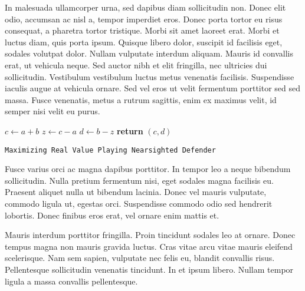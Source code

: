 \documentclass{article}
\theoremstyle{plain}
\theoremstyle{definition}
\theoremstyle{remark}
\begin{document}
In malesuada ullamcorper urna, sed dapibus diam sollicitudin non. Donec elit odio, accumsan ac nisl a, tempor imperdiet eros. Donec porta tortor eu risus consequat, a pharetra tortor tristique. Morbi sit amet laoreet erat. Morbi et luctus diam, quis porta ipsum. Quisque libero dolor, suscipit id facilisis eget, sodales volutpat dolor. Nullam vulputate interdum aliquam. Mauris id convallis erat, ut vehicula neque. Sed auctor nibh et elit fringilla, nec ultricies dui sollicitudin. Vestibulum vestibulum luctus metus venenatis facilisis. Suspendisse iaculis augue at vehicula ornare. Sed vel eros ut velit fermentum porttitor sed sed massa. Fusce venenatis, metus a rutrum sagittis, enim ex maximus velit, id semper nisi velit eu purus.

\begin{center}
	\begin{minipage}{1\linewidth} %
		\begin{algorithm}[H]
			\medskip
			$c \leftarrow a + b$ \;
			$z \leftarrow c - a$ \;
			$d \leftarrow b - z$ \;
			{\bf return} $(c,d)$ \;
			\caption{\texttt{Maximizing Real Value Playing Nearsighted Defender}} %
			\label{alg:nearsighted}   %
		\end{algorithm}
	\end{minipage}
\end{center}

Fusce varius orci ac magna dapibus porttitor. In tempor leo a neque bibendum sollicitudin. Nulla pretium fermentum nisi, eget sodales magna facilisis eu. Praesent aliquet nulla ut bibendum lacinia. Donec vel mauris vulputate, commodo ligula ut, egestas orci. Suspendisse commodo odio sed hendrerit lobortis. Donec finibus eros erat, vel ornare enim mattis et.

Mauris interdum porttitor fringilla. Proin tincidunt sodales leo at ornare. Donec tempus magna non mauris gravida luctus. Cras vitae arcu vitae mauris eleifend scelerisque. Nam sem sapien, vulputate nec felis eu, blandit convallis risus. Pellentesque sollicitudin venenatis tincidunt. In et ipsum libero. Nullam tempor ligula a massa convallis pellentesque.

\end{document}
